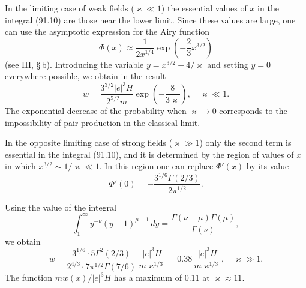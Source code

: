 In the limiting case of weak fields ($\varkappa \ll 1$) the essential values of $x$ in the integral (91.10) are those near the lower limit. Since these values are large, one can use the asymptotic expression for the Airy function
\[
\Phi(x) \approx \frac{1}{2x^{1/4}}\exp\!\left(-\frac{2}{3}x^{3/2}\right)
\]
(see III, \S\,b). Introducing the variable $y = x^{3/2} - 4/\varkappa$ and setting $y = 0$ everywhere possible, we obtain in the result
\begin{equation}
w = \frac{3^{3/2}|e|^3H}{2^{5/2}m}\exp\!\left(-\frac{8}{3\varkappa}\right), \quad \varkappa \ll 1.
\label{eq:91.11}
\end{equation}
The exponential decrease of the probability when $\varkappa \to 0$ corresponds to the impossibility of pair production in the classical limit.


In the opposite limiting case of strong fields ($\varkappa \gg 1$) only the second term is essential in the integral (91.10), and it is determined by the region of values of $x$ in which $x^{3/2} \sim 1/\varkappa \ll 1$. In this region one can replace $\Phi'(x)$ by its value
\[
\Phi'(0) = -\frac{3^{1/6}\Gamma(2/3)}{2\pi^{1/2}}.
\]

Using the value of the integral
\[
\int_1^\infty y^{-\nu}(y-1)^{\mu-1}\,dy = \frac{\Gamma(\nu-\mu)\Gamma(\mu)}{\Gamma(\nu)},
\]
we obtain
\begin{equation}
w = \frac{3^{1/6}\cdot 5\Gamma^2(2/3)}{2^{4/3}\cdot 7\pi^{1/2}\Gamma(7/6)}\,\frac{|e|^3H}{m\varkappa^{1/3}} = 0.38\,\frac{|e|^3H}{m\varkappa^{1/3}}, \quad \varkappa \gg 1.
\label{eq:91.12}
\end{equation}
The function $mw(x)/|e|^3H$ has a maximum of 0.11 at $\varkappa \approx 11$.

